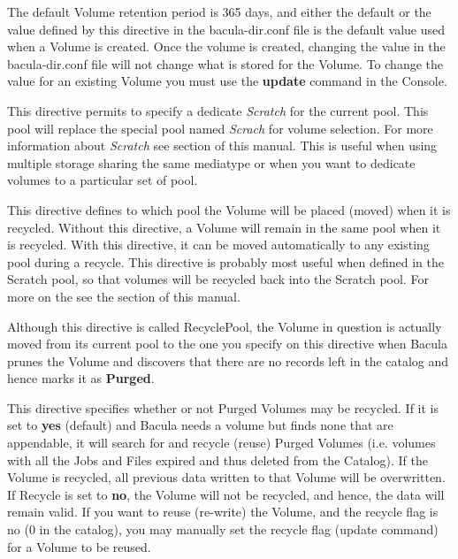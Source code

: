 \begin{description}
   The default Volume retention period is 365 days, and either the default
   or the value defined by this directive in the bacula-dir.conf file is
   the default value used when a Volume is created.  Once the volume is
   created, changing the value in the bacula-dir.conf file will not change
   what is stored for the Volume.  To change the value for an existing
   Volume you must use the {\bf update} command in the Console.

\label{PoolScratchPool}
\item [ScratchPool = \lt{}pool-resource-name\gt{}]
   This directive permits to specify a dedicate \textsl{Scratch} for the
   current pool. This pool will replace the special pool named \textsl{Scrach}
   for volume selection. For more information about \textsl{Scratch} see
    section of this manual. This is useful
   when using multiple storage sharing the same mediatype or when you want to
   dedicate volumes to a particular set of pool.

\label{PoolRecyclePool}
\item [RecyclePool = \lt{}pool-resource-name\gt{}]
   This directive defines to which pool
   the Volume will be placed (moved) when it is recycled. Without
   this directive, a Volume will remain in the same pool when it is
   recycled. With this directive, it can be moved automatically to any
   existing pool during a recycle. This directive is probably most
   useful when defined in the Scratch pool, so that volumes will
   be recycled back into the Scratch pool. For more on the see the   
    section of this manual.

   Although this directive is called RecyclePool, the Volume in
   question is actually moved from its current pool to the one
   you specify on this directive when Bacula prunes the Volume and
   discovers that there are no records left in the catalog and hence
   marks it as {\bf Purged}.
        
   
\label{PoolRecycle}
\item [Recycle = \lt{}yes\vb{}no\gt{}]
   This directive specifies whether or not Purged Volumes may be recycled.
   If it is set to {\bf yes} (default) and Bacula needs a volume but finds
   none that are appendable, it will search for and recycle (reuse) Purged
   Volumes (i.e.  volumes with all the Jobs and Files expired and thus
   deleted from the Catalog).  If the Volume is recycled, all previous data
   written to that Volume will be overwritten. If Recycle is set to {\bf
   no}, the Volume will not be recycled, and hence, the data will remain
   valid.  If you want to reuse (re-write) the Volume, and the recycle flag
   is no (0 in the catalog), you may manually set the recycle flag (update
   command) for a Volume to be reused.


\end{description}
